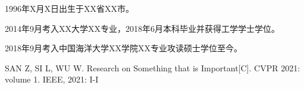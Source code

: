 \documentclass[
    Print       = false,
    Title       = 中国海洋大学硕博学位论文LaTeX模板,
    Author      = 作者,
    Advisor     = 指导教师,
    Thesis      = 全日制专业学位,
    Major       = 专业名称,
    Topic       = 研究方向,
    Year        = 2021,
    Month       = 4,
    Day         = 28,
    TitleEng    = {{LaTeX template for master's and doctoral dissertations of Ocean University of China}}
]{oucthesis}
\begin{document}
    \begin{profile}
        1996年X月X日出生于XX省XX市。

        2014年9月考入XX大学XX专业，2018年6月本科毕业并获得工学学士学位。

        2018年9月考入中国海洋大学XX学院XX专业攻读硕士学位至今。
    \end{profile}

    \begin{mypaper}
        \item SAN Z, SI L, WU W. Research on Something that is Important[C]. CVPR 2021: volume 1. IEEE, 2021: I-I
    \end{mypaper}

    \makebackcover
\end{document}
